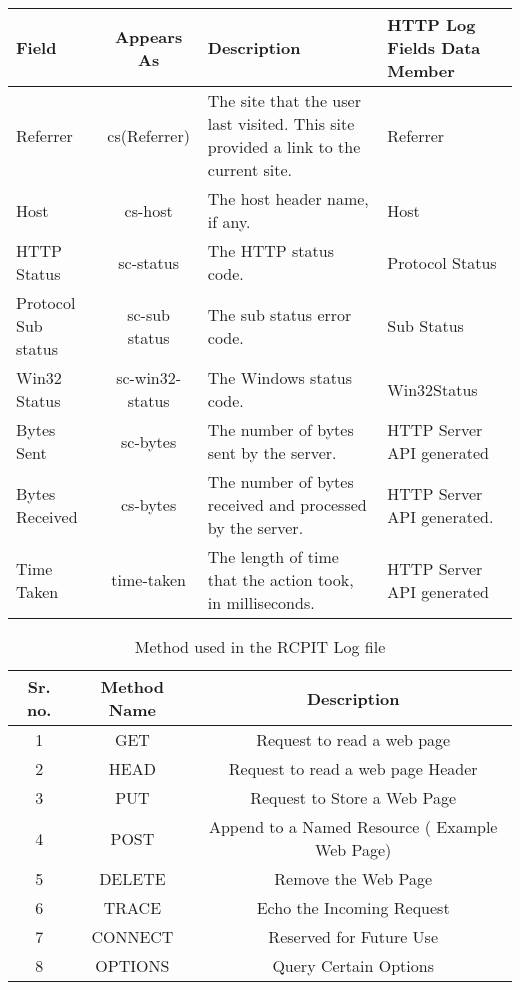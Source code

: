 \documentclass{RCPT}
\begin{document}
\begin{table}
\begin{center}
\begin{longtable}{ | p{2cm} | c | p{5cm} | p{4cm} |}
\hline
{\bf Field} & {\bf Appears As} & {\bf Description} & {\bf HTTP Log Fields Data Member} \\
\hline
\hline
Referrer  & cs(Referrer) & The site that the user last visited. This site provided a link to the current site. & Referrer \\  \hline
 Host & cs-host & The host header name, if any. & Host \\  \hline
HTTP Status  & sc-status & The HTTP status code. & Protocol Status \\  \hline
 Protocol Sub status & sc-sub status & The sub status error code. & Sub Status \\  \hline
 Win32 Status & sc-win32-status & The Windows status code. & Win32Status \\  \hline
 Bytes Sent & sc-bytes & The number of bytes sent by the server. & HTTP Server API generated \\  \hline
 Bytes Received & cs-bytes & The number of bytes received and processed by the server. & HTTP Server API generated. \\  \hline
 Time Taken & time-taken & The length of time that the action took, in milliseconds. & HTTP Server API generated \\  \hline \hline


\end{longtable}
\end{center}
\end{table}





\begin{table}
  \centering
  \caption{Method used in the RCPIT Log file}\label{Method used in the RCPIT Log file}

\begin{tabular}{| c | c | c |}
\hline 
  {\bf Sr. no.} & {\bf Method Name} & {\bf Description} \\ \hline
   1 & GET & Request to read a web page \\ \hline
   2 & HEAD & Request to read a web page Header \\ \hline
3 & PUT & Request to Store a Web Page \\ \hline
4 & POST & Append to a Named Resource ( Example Web Page) \\ \hline
5 & DELETE & Remove the Web Page  \\ \hline
6 & TRACE & Echo the Incoming Request \\ \hline
7 & CONNECT & Reserved for Future Use \\ \hline
8 & OPTIONS & Query Certain Options \\ \hline

\end{tabular}
\end{table}
\end{document}
